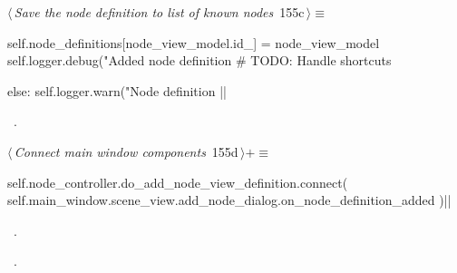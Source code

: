\documentclass[%
    a4paper,    %
    justified,  %
    nobib,      %
    openany     %
]{tufte-book}
\begin{document}
%
\begin{flushleft} \small
\begin{minipage}{\linewidth}\label{scrap164}\raggedright\small
{} $\langle\,${\itshape Save the node definition to list of known nodes}\nobreak\ {\footnotesize {155c}}$\,\rangle\equiv$
\vspace{-1ex}
\begin{pythoncode}
    self.node_definitions[node_view_model.id_] = node_view_model
    self.logger.debug("Added node definition %
    # TODO: Handle shortcuts

else:
    self.logger.warn("Node definition %
|\NWsep|
\end{pythoncode}
\vspace{1.5ex}
\footnotesize
\begin{list}{}{\setlength{\itemsep}{-\parsep}\setlength{\itemindent}{-\leftmargin}}
\item \NWtxtMacroRefIn\ .

\item{}
\end{list}
\end{minipage}\vspace{4ex}
\end{flushleft}
%
\begin{flushleft} \small
\begin{minipage}{\linewidth}\label{scrap165}\raggedright\small
{} $\langle\,${\itshape Connect main window components}\nobreak\ {\footnotesize {155d}}$\,\rangle+\equiv$
\vspace{-1ex}
\begin{pythoncode}
self.node_controller.do_add_node_view_definition.connect(
    self.main_window.scene_view.add_node_dialog.on_node_definition_added
    )|\NWsep|
\end{pythoncode}
\vspace{1.5ex}
\footnotesize
\begin{list}{}{\setlength{\itemsep}{-\parsep}\setlength{\itemindent}{-\leftmargin}}
\item \NWtxtMacroDefBy\ .
\item \NWtxtMacroRefIn\ .

\item{}
\end{list}
\end{minipage}\vspace{4ex}
\end{flushleft}
\end{document}
